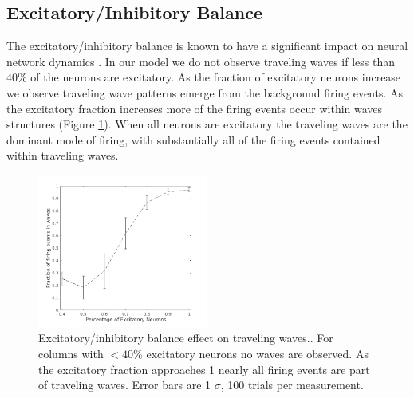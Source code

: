 \documentclass[a4paper,11pt]{article}
\begin{document}
\subsection{Excitatory/Inhibitory Balance} \label{sub:ei_balance}
The excitatory/inhibitory balance is known to have a significant impact on neural network dynamics \cite{keane2015}. 
In our model we do not observe traveling waves if less than $40\%$ of the neurons are excitatory.
As the fraction of excitatory neurons increase we observe traveling wave patterns emerge from the background firing events.
As the excitatory fraction increases more of the firing events occur within waves structures (Figure \ref{fig:excitatory_effect}).
When all neurons are excitatory the traveling waves are the dominant mode of firing, with substantially all of the firing events contained within traveling waves. \\
\begin{figure}[!htb]
 \caption{Excitatory/inhibitory balance effect on traveling waves.. 
	  For columns with $<40\%$ excitatory neurons no waves are observed.
	  As the excitatory fraction approaches 1 nearly all firing events are part of traveling waves.
	  Error bars are 1 $\sigma$, 100 trials per measurement.
	  }
 \label{fig:excitatory_effect}
 \centering
   \includegraphics[width=0.5\textwidth]{fig/ExcitatoryWaves}
\end{figure}
\end{document}
